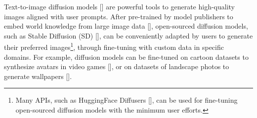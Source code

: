\documentclass{article}
\begin{document}
Text-to-image diffusion models [] are powerful tools to generate high-quality images aligned with user prompts. After pre-trained by model publishers to embed world knowledge from large image data [], open-sourced diffusion models, such as Stable Diffusion (SD) [], can be conveniently adapted by users to generate their preferred images\footnote{Many APIs, such as HuggingFace Diffusers [], can be used for fine-tuning open-sourced diffusion models with the minimum user efforts.}, through fine-tuning with custom data in specific domains. For example, diffusion models can be fine-tuned on cartoon datasets to synthesize avatars in video games [], or on datasets of landscape photos to generate wallpapers []. 
\end{document}
